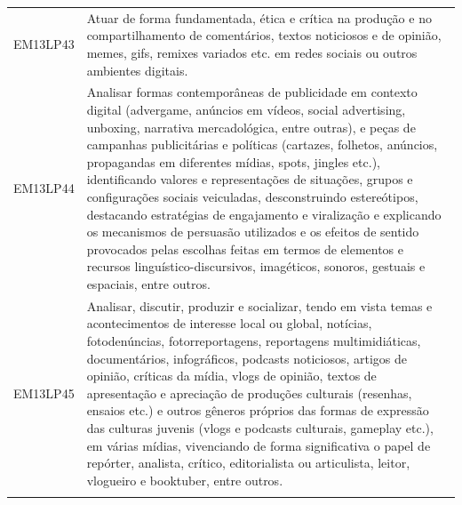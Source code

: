 \documentclass[12pt]{extarticle}
\begin{document}
\begin{longtable}{ll}
EM13LP43   & Atuar de forma fundamentada, ética e crítica na produção e no compartilhamento de comentários, textos noticiosos e de opinião, memes, gifs, remixes variados etc. em redes sociais ou outros ambientes digitais.                                                                                                                                                                                                                                                                                                                                                                                                                                                                                                                                                                                                      \\
\rowcolor[HTML]{FFF} 
EM13LP44   & Analisar formas contemporâneas de publicidade em contexto digital (advergame, anúncios em vídeos, social advertising, unboxing, narrativa mercadológica, entre outras), e peças de campanhas publicitárias e políticas (cartazes, folhetos, anúncios, propagandas em diferentes mídias, spots, jingles etc.), identificando valores e representações de situações, grupos e configurações sociais veiculadas, desconstruindo estereótipos, destacando estratégias de engajamento e viralização e explicando os mecanismos de persuasão utilizados e os efeitos de sentido provocados pelas escolhas feitas em termos de elementos e recursos linguístico-discursivos, imagéticos, sonoros, gestuais e espaciais, entre outros.                                                                                        \\
\rowcolor[HTML]{E0F7FA} 
EM13LP45   & Analisar, discutir, produzir e socializar, tendo em vista temas e acontecimentos de interesse local ou global, notícias, fotodenúncias, fotorreportagens, reportagens multimidiáticas, documentários, infográficos, podcasts noticiosos, artigos de opinião, críticas da mídia, vlogs de opinião, textos de apresentação e apreciação de produções culturais (resenhas, ensaios etc.) e outros gêneros próprios das formas de expressão das culturas juvenis (vlogs e podcasts culturais, gameplay etc.), em várias mídias, vivenciando de forma significativa o papel de repórter, analista, crítico, editorialista ou articulista, leitor, vlogueiro e booktuber, entre outros.                                                                                                                                     \\
\rowcolor[HTML]{FFF} 

\end{longtable}
\end{document}
